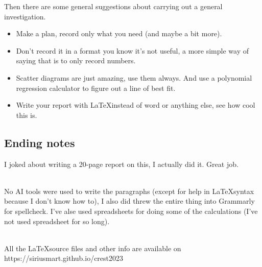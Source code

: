 \documentclass{article}
\begin{document}
\noindent
Then there are some general suggestions about carrying out a general investigation.

\begin{itemize}
  \item Make a plan, record only what you need (and maybe a bit more).
  \item Don't record it in a format you know it's not useful, a more simple way of saying that is to only record numbers.
  \item Scatter diagrams are just amazing, use them always. And use a polynomial regression calculator to figure out a line of best fit.
  \item Write your report with \LaTeX\space instead of word or anything else, see how cool this is.
\end{itemize}

\subsection{Ending notes}

I joked about writing a 20-page report on this, I actually did it. Great job.

\noindent\\
No AI tools were used to write the paragraphs (except for help in \LaTeX\space syntax because I don't know how to), I also did threw the entire thing into Grammarly for spellcheck. I've alse used spreadsheets for doing some of the calculations (I've not used spreadsheet for so long).

\noindent\\
All the \LaTeX\space source files and other info are available on https://siriusmart.github.io/crest2023
\end{document}

